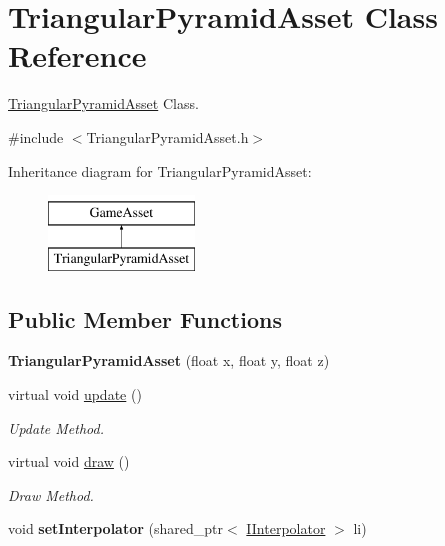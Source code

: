 \hypertarget{classTriangularPyramidAsset}{\section{Triangular\-Pyramid\-Asset Class Reference}
\label{classTriangularPyramidAsset}
}


\hyperlink{classTriangularPyramidAsset}{Triangular\-Pyramid\-Asset} Class.  




{\ttfamily \#include $<$Triangular\-Pyramid\-Asset.\-h$>$}

Inheritance diagram for Triangular\-Pyramid\-Asset\-:\begin{figure}[H]
\begin{center}
\leavevmode
\includegraphics[height=2.000000cm]{classTriangularPyramidAsset}
\end{center}
\end{figure}
\subsection*{Public Member Functions}
\begin{DoxyCompactItemize}
\item 
\hypertarget{classTriangularPyramidAsset_a16069bd2b6fd057fb1a9a5dff1742989}{{\bfseries Triangular\-Pyramid\-Asset} (float x, float y, float z)}\label{classTriangularPyramidAsset_a16069bd2b6fd057fb1a9a5dff1742989}

\item 
virtual void \hyperlink{classTriangularPyramidAsset_a9fcab20720ad22e5e50139332b3f0190}{update} ()
\begin{DoxyCompactList}\small\item\em Update Method. \end{DoxyCompactList}\item 
virtual void \hyperlink{classTriangularPyramidAsset_a9a6c04fc73cbfc2c01477907f3033a17}{draw} ()
\begin{DoxyCompactList}\small\item\em Draw Method. \end{DoxyCompactList}\item 
\hypertarget{classTriangularPyramidAsset_a0bd9699607ea85bfde40e793ba34e142}{void {\bfseries set\-Interpolator} (shared\-\_\-ptr$<$ \hyperlink{classIInterpolator}{I\-Interpolator} $>$ li)}\label{classTriangularPyramidAsset_a0bd9699607ea85bfde40e793ba34e142}

\end{DoxyCompactItemize}
